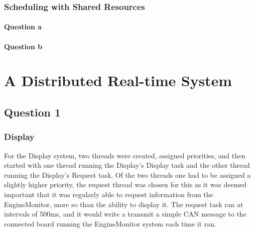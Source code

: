 \documentclass[]{report}
\begin{document}
		
		\subsection{Scheduling with Shared Resources}
			\subsubsection{Question a}
		


			\subsubsection{Question b}
	
	\chapter{A Distributed Real-time System}
		\section{Question 1}
		
			\subsection{Display}
			For the Display system, two threads were created, assigned priorities, and then started with one thread running the Display's Display task and the other thread running the Display's Request task. Of the two threads one had to be assigned a slightly higher priority, the request thread was chosen for this as it was deemed important that it was regularly able to request information from the EngineMonitor, more so than the ability to display it. The request task ran at intervals of 500ms, and it would write a transmit a simple CAN message to the connected board running the EngineMonitor system each time it ran.
			
\end{document}
